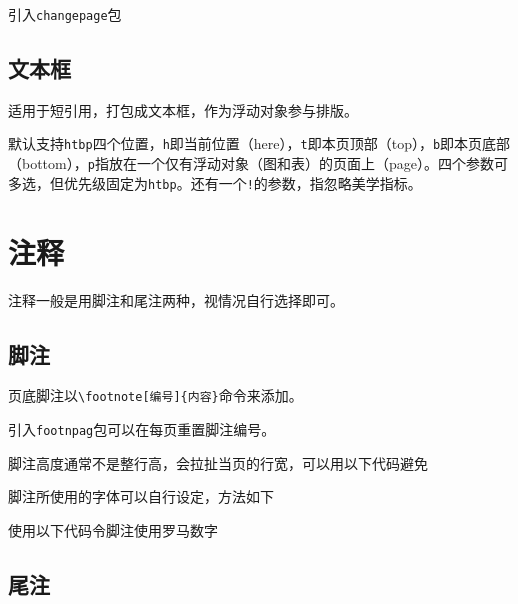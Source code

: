 \documentclass[10pt,openany]{book}
\begin{document}
\begin{sloppypar}
    引入\texttt{changepage}包

    

    \section{文本框}

    适用于短引用，打包成文本框，作为浮动对象参与排版。

    

    默认支持\texttt{htbp}四个位置，\texttt{h}即当前位置（here），\texttt{t}即本页顶部（top），\texttt{b}即本页底部（bottom），\texttt{p}指放在一个仅有浮动对象（图和表）的页面上（page）。四个参数可多选，但优先级固定为\texttt{htbp}。还有一个\texttt{!}的参数，指忽略美学指标。

    \chapter{注释}

    注释一般是用脚注和尾注两种，视情况自行选择即可。

    \section{脚注}

    页底脚注以\texttt{\textbackslash{}footnote{[}编号{]}\{内容\}}命令来添加。

    

    引入\texttt{footnpag}包可以在每页重置脚注编号。

    

    脚注高度通常不是整行高，会拉扯当页的行宽，可以用以下代码避免

    

    脚注所使用的字体可以自行设定，方法如下

    

    使用以下代码令脚注使用罗马数字

    

    \section{尾注}


\end{sloppypar}
\end{document}
